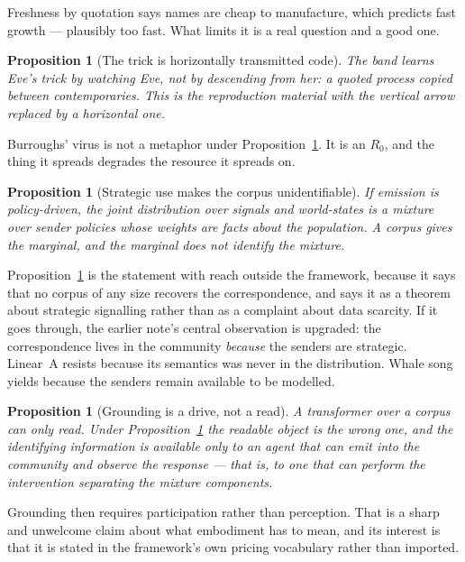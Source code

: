 \documentclass[11pt]{article}
\theoremstyle{plain}
\newtheorem{proposition}[theorem]{Proposition}
\theoremstyle{definition}
\begin{document}
Freshness by quotation says names are cheap to manufacture, which predicts fast growth --- plausibly too
fast. What limits it is a real question and a good one.

\begin{proposition}[The trick is horizontally transmitted code]
\label{prop:E}
The band learns Eve's trick by watching Eve, not by descending from her: a quoted process copied between
contemporaries. This is the reproduction material with the vertical arrow replaced by a horizontal one.
\end{proposition}

Burroughs' virus is not a metaphor under Proposition~\ref{prop:E}. It is an $R_{0}$, and the thing it
spreads degrades the resource it spreads on.

\begin{proposition}[Strategic use makes the corpus unidentifiable]
\label{prop:F}
If emission is policy-driven, the joint distribution over signals and world-states is a mixture over
sender policies whose weights are facts about the population. A corpus gives the marginal, and the
marginal does not identify the mixture.
\end{proposition}

Proposition~\ref{prop:F} is the statement with reach outside the framework, because it says that no
corpus of any size recovers the correspondence, and says it as a theorem about strategic signalling
rather than as a complaint about data scarcity. If it goes through, the earlier note's central
observation is upgraded: the correspondence lives in the community \emph{because} the senders are
strategic. Linear~A resists because its semantics was never in the distribution. Whale song yields
because the senders remain available to be modelled.

\begin{proposition}[Grounding is a drive, not a read]
\label{prop:G}
A transformer over a corpus can only read. Under Proposition~\ref{prop:F} the readable object is the
wrong one, and the identifying information is available only to an agent that can emit into the
community and observe the response --- that is, to one that can perform the intervention separating the
mixture components.
\end{proposition}

Grounding then requires participation rather than perception. That is a sharp and unwelcome claim about
what embodiment has to mean, and its interest is that it is stated in the framework's own pricing
vocabulary rather than imported.
\end{document}
